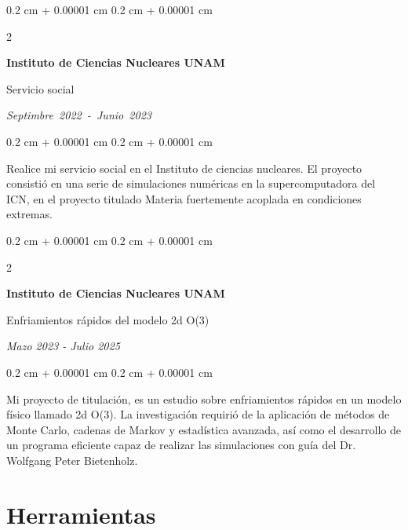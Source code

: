 \documentclass[10pt, letterpaper]{article}
\newenvironment{onecolentry}{
    \begin{adjustwidth}{
        0.2 cm + 0.00001 cm
    }{
        0.2 cm + 0.00001 cm
    }
}{
    \end{adjustwidth}
} %
\newenvironment{twocolentry}[2][]{
    \onecolentry
    \def\secondColumn{#2}
    \setcolumnwidth{\fill, 4.5 cm}
    \begin{paracol}{2}
}{
    \switchcolumn \raggedleft \secondColumn
    \end{paracol}
    \endonecolentry
} %
\let\hrefWithoutArrow\href
\renewcommand{\href}[2]{\hrefWithoutArrow{#1}{\ifthenelse{\equal{#2}{}}{ }{#2 }\raisebox{.15ex}{\footnotesize \faExternalLink*}}}
\begin{document}
        \vspace{0.2 cm}

        \begin{twocolentry}{
            \mbox{\textit{Septimbre 2022 - Junio 2023}}}
            \textbf{Instituto de Ciencias Nucleares UNAM}
            
            {\color{blue}Servicio social}
        \end{twocolentry}

        \vspace{0.10 cm}
        \begin{onecolentry}
            Realice mi servicio social en el Instituto de ciencias nucleares. El proyecto consistió en una serie de simulaciones numéricas en la supercomputadora del ICN, en el proyecto titulado Materia fuertemente acoplada en condiciones
extremas.
        \end{onecolentry}

        \vspace{0.2 cm}
        \begin{twocolentry}{
            
            \textit{Mazo 2023 - Julio 2025}}
            \textbf{Instituto de Ciencias Nucleares UNAM}
            
            {\color{blue}Enfriamientos rápidos del modelo 2d O(3)}
        \end{twocolentry}

        \vspace{0.10 cm}
        \begin{onecolentry}
            Mi proyecto de titulación, es un estudio sobre enfriamientos rápidos en un modelo físico llamado 2d O(3). La investigación requirió de la aplicación de métodos de Monte Carlo, cadenas de Markov y estadística avanzada, así como el desarrollo de un programa eficiente capaz de realizar las simulaciones con guía del Dr. Wolfgang Peter Bietenholz.
        \end{onecolentry}



    
    
    
    \section{Herramientas}



        
\end{document}
